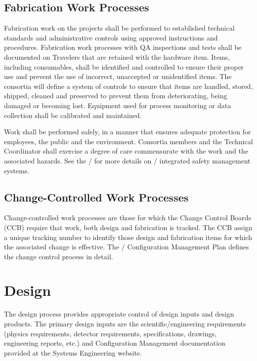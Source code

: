 \subsection{Fabrication Work Processes}

Fabrication work on the  projects shall be performed to
established technical standards and administrative controls using
approved instructions and procedures. Fabrication work processes with
QA inspections and tests shall be documented on Travelers that are
retained with the hardware item. Items, including consumables, shall
be identified and controlled to ensure their proper use and prevent
the use of incorrect, unaccepted or unidentified items. The consortia
will define a system of controls to ensure that items are handled,
stored, shipped, cleaned and preserved to prevent them from
deteriorating, being damaged or becoming lost. Equipment used for
process monitoring or data collection shall be calibrated and
maintained.

Work shall be performed safely, in a manner that ensures adequate
protection for employees, the public and the environment. Consortia
members and the  Technical Coordinator shall exercise a degree of
care commensurate with the work and the associated hazards. See the
/  for more details on /
integrated safety management systems.

\subsection{Change-Controlled Work Processes}

Change-controlled work processes are those for which the 
Change Control Boards (CCB) require that work, both design and
fabrication is tracked. The CCB assign a unique tracking number to
identify those design and fabrication items for which the associated
change is effective. The / Configuration
Management Plan defines the change control process in detail.

\section{Design}

The  design process provides appropriate control of design inputs
and design products. The primary design inputs are the 
scientific/engineering requirements (physics requirements, detector
requirements, specifications, drawings, engineering reports, etc.) and
Configuration Management documentation provided at the Systems
Engineering website. 

